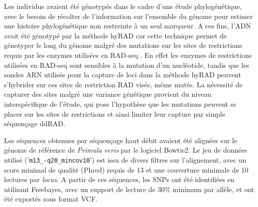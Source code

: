 Les individus avaient été génotypés dans le cadre d'une étude phylogénétique, avec le besoin de récolter de l'information sur l'ensemble du génome pour estimer une histoire phylogénétique non restreinte à un seul marqueur. A ces fins, l'ADN avait été génotypé par la méthode hyRAD \citep{Suchan2016} car cette technique permet de génotyper le long du génome malgré des mutations sur les sites de restrictions requis par les enzymes utilisées en RAD-seq \citep{Davey2010}. En effet les enzymes de restrictions utilisées en RAD-seq sont sensibles à la mutation d'un nucléotide, tandis que les sondes ARN utilisés pour la capture de loci dans la méthode hyRAD peuvent s'hybrider sur ces sites de restriction RAD visés, même mutés. La nécessité de capturer des sites malgré une variance génétique provient du niveau interspécifique de l'étude, qui pose l'hypothèse que les mutations peuvent se placer sur les sites de restrictions et ainsi limiter leur capture par simple séquençage ddRAD. 

Les séquences obtenues par séquençage haut débit avaient été alignées sur le génome de référence de \textit{Primula veris} par le logiciel Bowtie2. Le jeu de données utilisé ('\verb|m13_-q20_mincov10|') est issu de divers filtres sur l'alignement, avec un score minimal de qualité (Phred) requis de 13 et une couverture minimale de 10 lectures par \textit{locus}. A partir de ces séquences, les SNPs ont été identifiées en utilisant Freebayes, avec un support de lecture de 30\% minimum par allèle, et ont été exportés sous format VCF.


